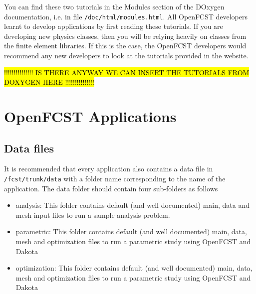 You can find these two tutorials in the Modules section of the DOxygen documentation, i.e. in file \texttt{/doc/html/modules.html}. All OpenFCST developers learnt to develop applications by first reading these tutorials. If you are developing new physics classes, then you will be relying heavily on classes from the  finite element libraries. If this is the case, the OpenFCST developers would recommend any new developers to look at the tutorials provided in the  website.

\hl{!!!!!!!!!!!!!!! IS THERE ANYWAY WE CAN INSERT THE TUTORIALS FROM DOXYGEN HERE !!!!!!!!!!!!!!!}

\section{OpenFCST Applications}

\subsection{Data files}

It is recommended that every application also contains a data file in \texttt{/fcst/trunk/data} with a folder name corresponding to the name of the application. The data folder should contain four sub-folders as follows
\begin{itemize}
 \item analysis: This folder contains default (and well documented) main, data and mesh input files to run a sample analysis problem.
 \item parametric: This folder contains default (and well documented) main, data, mesh and optimization files to run a parametric study using OpenFCST and Dakota
 \item optimization: This folder contains default (and well documented) main, data, mesh and optimization files to run a parametric study using OpenFCST and Dakota
\end{itemize}



